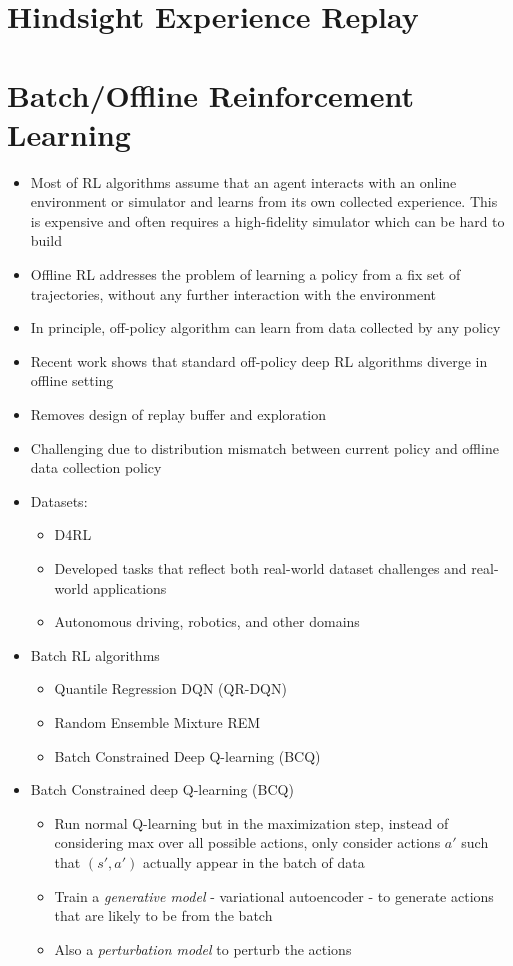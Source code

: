 \documentclass[../main.tex]{subfiles}
\begin{document}
\section{Hindsight Experience Replay}

\section{Batch/Offline Reinforcement Learning}
\begin{itemize}
  \item Most of RL algorithms assume that an agent interacts with an online environment or simulator and learns from its own collected experience. This is expensive and often requires a high-fidelity simulator which can be hard to build
  \item Offline RL addresses the problem of learning a policy from a fix set of trajectories, without any further interaction with the environment
  \item In principle, off-policy algorithm can learn from data collected by any policy
  \item Recent work shows that standard off-policy deep RL algorithms diverge in offline setting
  \item Removes design of replay buffer and exploration
  \item Challenging due to distribution mismatch between current policy and offline data collection policy
  \item Datasets:
  \begin{itemize}
    \item D4RL
    \item Developed tasks that reflect both real-world dataset challenges and real-world applications
    \item Autonomous driving, robotics, and other domains
  \end{itemize}
  \item Batch RL algorithms
  \begin{itemize}
    \item Quantile Regression DQN (QR-DQN)
    \item Random Ensemble Mixture {REM}
    \item Batch Constrained Deep Q-learning (BCQ)
  \end{itemize}

  \item Batch Constrained deep Q-learning (BCQ) \cite{bcq}
  \begin{itemize}
    \item Run normal Q-learning but in the maximization step, instead of considering max over all possible actions, only consider actions $a'$ such that $(s',a')$ actually appear in the batch of data
    \item Train a \textit{generative model} - variational autoencoder - to generate actions that are likely to be from the batch
    \item Also a \textit{perturbation model} to perturb the actions
  \end{itemize}


\end{itemize}
\end{document}
